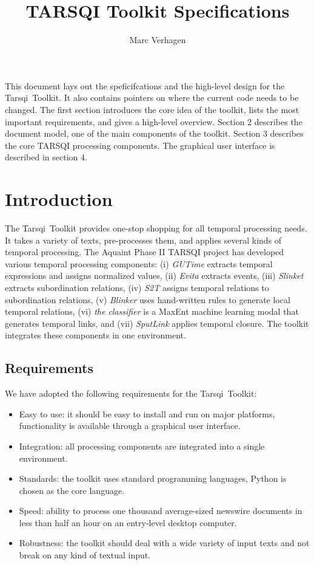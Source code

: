 \documentclass[11pt]{article}
\newcommand{\tarsqi}{T{\sc arsqi}}
\begin{document}
\title{TARSQI Toolkit Specifications}
\author{Marc Verhagen}

\maketitle

This document lays out the speficifcations and the high-level design for the \tarsqi\ Toolkit. It also contains pointers on where the current code needs to be changed. The first section introduces the core idea of the toolkit, lists the most important requirements, and gives a high-level overview. Section 2 describes the document model, one of the main components of the toolkit. Section 3 describes the core TARSQI processing components. The graphical user interface is described in section 4.
 

\section{Introduction}

The \tarsqi\ Toolkit provides one-stop shopping for all temporal processing needs. It takes a variety of texts, pre-processes them, and applies several kinds of temporal processing. The Aquaint Phase II TARSQI project has developed various temporal processing components: (i) {\em GUTime} extracts temporal expressions and assigns normalized values, (ii) {\em Evita} extracts events, (iii) {\em Slinket} extracts subordination  relations, (iv) {\em S2T} assigns temporal relations to subordination relations, (v) {\em Blinker} uses hand-written rules to generate local temporal relations, (vi) {\em the classifier} is a MaxEnt machine learning modal that generates temporal links, and (vii) {\em SputLink} applies temporal closure. The toolkit integrates these components in one environment. 


\subsection{Requirements}

We have adopted the following requirements for the \tarsqi\ Toolkit:

\begin{itemize}

\item Easy to use: it should be easy to install and run on major platforms, functionality is available through a graphical user interface.
\item Integration: all processing components are integrated into a single environment.
\item Standards: the toolkit uses standard programming languages, Python is chosen as the core language.
\item Speed: ability to process one thousand average-sized newswire documents in less than half an hour on an entry-level desktop computer.
\item Robustness: the toolkit should deal with a wide variety of input texts and not break on any kind of textual input.

\end{itemize}
\end{document}
